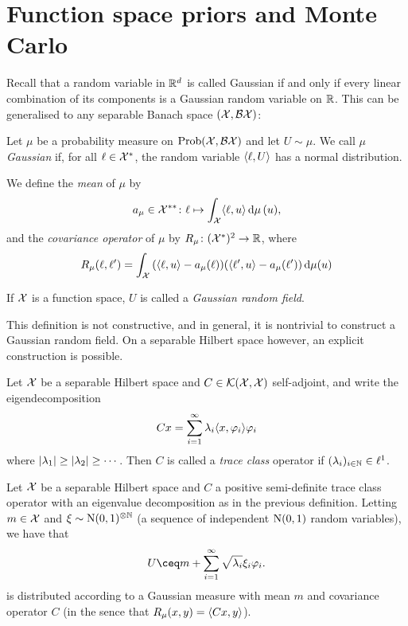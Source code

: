 \section{Function space priors and Monte Carlo}
Recall that a random variable in $\mathbb R^d$ is called Gaussian if and only if every linear combination of its components is a Gaussian random variable on $\mathbb R$. This can be generalised to any separable Banach space $(\mathcal X, \mathcal B\mathcal X)$: 
\begin{definition}
	Let $\mu$ be a probability measure on $\operatorname{Prob}(\mathcal X, \mathcal B\mathcal X)$ and let $U \sim \mu$. We call $\mu$ \emph{Gaussian} if, for all $\ell \in \mathcal X^*$, the random variable $\langle\ell, U\rangle$ has a normal distribution.
	
	We define the \emph{mean} of $\mu$ by  
	\[
	a_\mu \in \mathcal X^{**} \colon \ell \mapsto \int_\mathcal X  \langle\ell, u\rangle \dd{\mu}(u),
	\]
	and the \emph{covariance operator} of $\mu$ by $R_\mu \colon (\mathcal X^*)^2 \to \mathbb R$, where 
	\[
	R_\mu(\ell, \ell') = \int_\mathcal X \qty(\langle\ell, u\rangle - a_\mu(\ell))(\langle\ell', u\rangle - a_\mu(\ell'))\dd{\mu(u)}
	\]
	
	If $\mathcal X$ is a function space, $U$ is called a \emph{Gaussian random field}. 
\end{definition}

This definition is not constructive, and in general, it is nontrivial to construct a Gaussian random field. On a separable Hilbert space however, an explicit construction is possible. 

\begin{definition}
	Let $\mathcal X$ be a separable Hilbert space and $C \in \mathcal K(\mathcal X, \mathcal X)$ self-adjoint, 
	and write the eigendecomposition
	\[
	Cx = \sum_{i=1}^\infty \lambda_i \langle x, \varphi_i\rangle \varphi_i
	\]
	where $\abs{\lambda_1} \geq \abs{\lambda_2} \geq \dotsb$. Then $C$ is called a \emph{trace class} operator if $(\lambda_i)_{i \in \mathbb N} \in \ell^1$. 
\end{definition}

\begin{proposition}
	Let $\mathcal X$ be a separable Hilbert space and $C$ a positive semi-definite trace class operator with an eigenvalue decomposition as in the previous definition. Letting $m \in \mathcal X$ and $\xi \sim \mathrm N(0, 1)^{\otimes\mathbb N}$ (a sequence of independent $\mathrm N(0,1)$ random variables), we have that
	\[
	U \ceq m + \sum_{i=1}^\infty \sqrt{\lambda_i} \xi_i \phi_i. 
	\]
	is distributed according to a Gaussian measure with mean $m$ and covariance operator $C$ (in the sence that $R_\mu(x, y) = \langle Cx, y\rangle$). 
\end{proposition}

